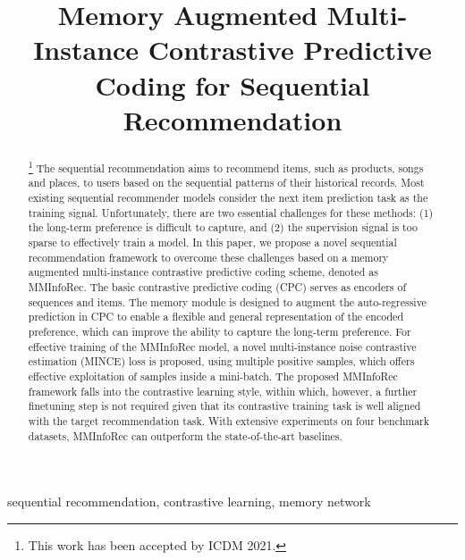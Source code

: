 \documentclass[conference]{IEEEtran}
\begin{document}
\title{Memory Augmented Multi-Instance Contrastive Predictive Coding for Sequential Recommendation}

\author{
}

\maketitle

\begin{abstract}\footnote{This work has been accepted by ICDM 2021.}
The sequential recommendation aims to recommend items, such as products, songs and places, to users based on the sequential patterns of their historical records. Most existing sequential recommender models consider the next item prediction task as the training signal. Unfortunately, there are two essential challenges for these methods: (1) the long-term preference is difficult to capture, and (2) the supervision signal is too sparse to effectively train a model. In this paper, we propose a novel sequential recommendation framework to overcome these challenges based on a memory augmented multi-instance contrastive predictive coding scheme, denoted as MMInfoRec. The basic contrastive predictive coding (CPC) serves as encoders of sequences and items. The memory module is designed to augment the auto-regressive prediction in CPC to enable a flexible and general representation of the encoded preference, which can improve the ability to capture the long-term preference. For effective training of the MMInfoRec model, a novel multi-instance noise contrastive estimation (MINCE) loss is proposed, using multiple positive samples, which offers effective exploitation of samples inside a mini-batch. The proposed MMInfoRec framework falls into the contrastive learning style, within which, however, a further finetuning step is not required given that its contrastive training task is well aligned with the target recommendation task. With extensive experiments on four benchmark datasets, MMInfoRec can outperform the state-of-the-art baselines.
\end{abstract}

\begin{IEEEkeywords}
sequential recommendation, contrastive learning, memory network
\end{IEEEkeywords}
\end{document}
